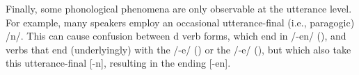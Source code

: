
  Finally, some phonological phenomena are only observable at the utterance level. For example, many speakers employ an occasional utterance-final \linebreak {} (i.e., paragogic)   /n/. This can cause confusion between d verb forms, which end in /-en/ (), and verbs that end (underlyingly) with the   /-e/ () or the  /-e/ (), but which also take this utterance-final  [-n], resulting in the  ending [-en].

